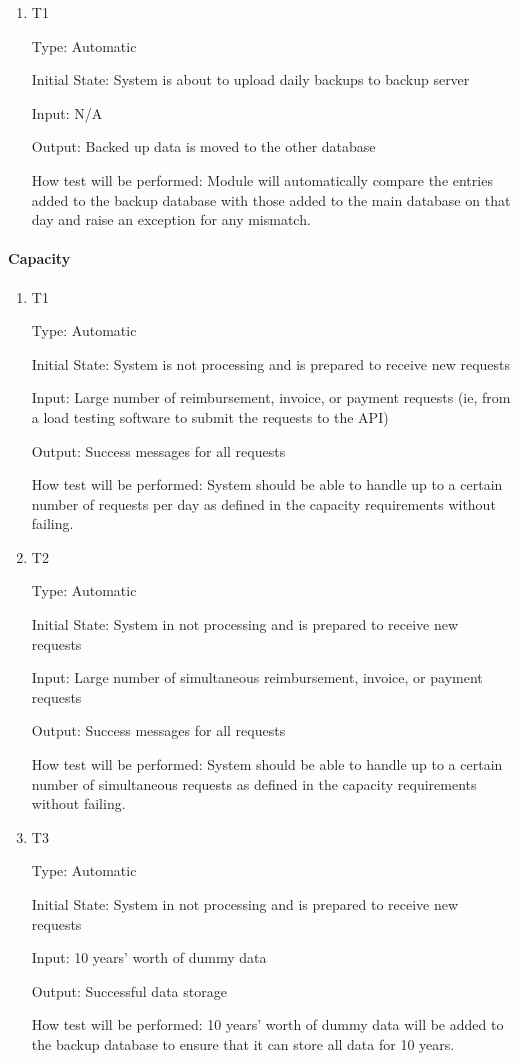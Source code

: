 \documentclass[12pt, titlepage]{article}
\begin{document}
\begin{enumerate}

\item{T1\\}

Type: Automatic

Initial State: System is about to upload daily backups to backup server

Input: N/A

Output: Backed up data is moved to the other database

How test will be performed: Module will automatically compare the entries added to the backup database with those added to the main database on that day and raise an exception for any mismatch.

\end{enumerate}

\paragraph{Capacity}

\begin{enumerate}
\item{T1\\}

Type: Automatic

Initial State: System is not processing and is prepared to receive new requests

Input: Large number of reimbursement, invoice, or payment requests (ie, from a load testing software to submit the requests to the API)

Output: Success messages for all requests

How test will be performed: System should be able to handle up to a certain number of requests per day as defined in the capacity requirements without failing.

\item{T2\\}

Type: Automatic

Initial State: System in not processing and is prepared to receive new requests

Input: Large number of simultaneous reimbursement, invoice, or payment requests

Output: Success messages for all requests

How test will be performed: System should be able to handle up to a certain number of simultaneous requests as defined in the capacity requirements without failing.

\item{T3\\}

Type: Automatic

Initial State: System in not processing and is prepared to receive new requests

Input: 10 years’ worth of dummy data

Output: Successful data storage

How test will be performed: 10 years’ worth of dummy data will be added to the backup database to ensure that it can store all data for 10 years.

\end{enumerate}
\end{document}
